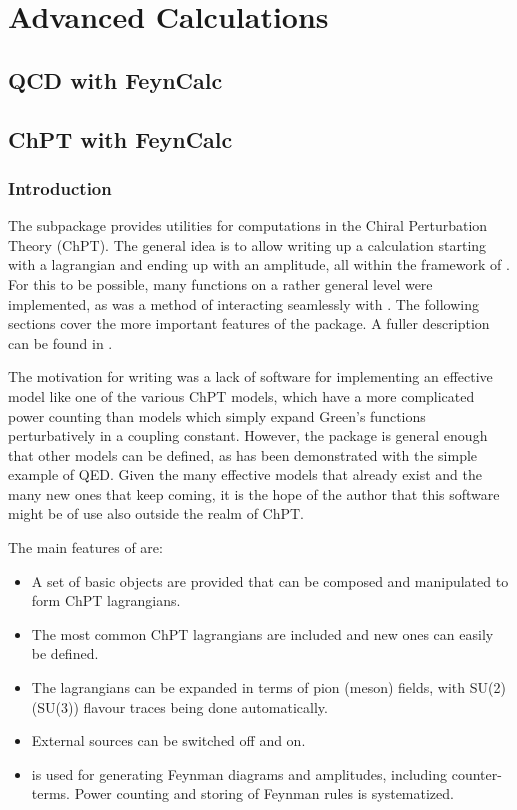 \section{Advanced Calculations}

\subsection{QCD with FeynCalc}

\subsection{ChPT with FeynCalc}

\subsubsection{Introduction}

The subpackage \fphi provides utilities for computations in the Chiral Perturbation Theory (ChPT). The general idea is to allow writing up a calculation starting with a lagrangian and ending up with an amplitude, all within the framework of \fc. For this to be possible, many functions on a rather general level were implemented, as was a method of interacting seamlessly with \fa. The following sections cover the more important features of the package. A fuller description can be found in \cite{PHI}.

The motivation for writing \fphi was a lack of software for implementing an effective model like one of the various ChPT models, which have a more complicated power counting than models which simply expand Green's functions perturbatively in a coupling constant. However, the package is general enough that other models can be defined, as has been demonstrated with the simple example of QED. Given the many effective models that already exist and the many new ones that keep coming, it is the hope of the author that this software might be of use also outside the realm of ChPT.

The main features of \fphi are:
\begin{itemize}
\item A set of basic objects are provided that can be composed and manipulated to form ChPT lagrangians.
\item The most common ChPT lagrangians are included and new ones can easily be defined.
\item The lagrangians can be expanded in terms of pion (meson) fields, with SU(2) (SU(3)) flavour traces being done automatically.
\item External sources can be switched off and on.
\item \fa is used for generating Feynman diagrams and amplitudes, including counter-terms. Power counting and storing of Feynman rules is systematized.
\end{itemize}

